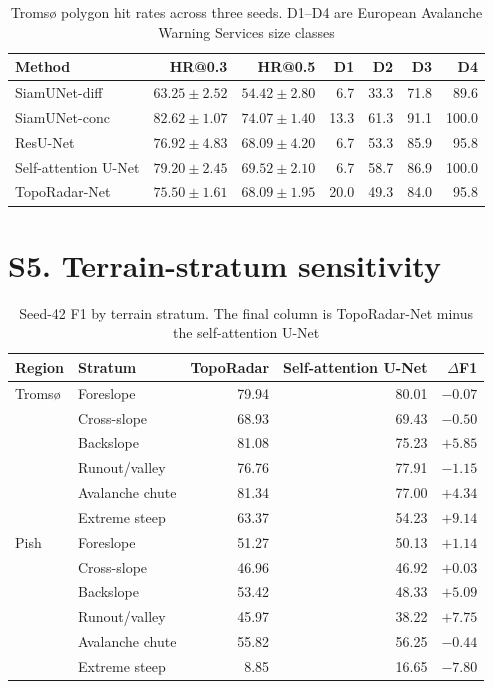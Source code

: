 \documentclass[11pt,a4paper]{article}
\begin{document}
\begin{table}[h]
\caption{Troms{\o} polygon hit rates across three seeds. D1--D4 are European Avalanche Warning Services size classes}
\centering
\small
\begin{tabular}{lrrrrrr}
\toprule
Method & HR@0.3 & HR@0.5 & D1 & D2 & D3 & D4 \\
\midrule
SiamUNet-diff & $63.25\pm2.52$ & $54.42\pm2.80$ & 6.7 & 33.3 & 71.8 & 89.6 \\
SiamUNet-conc & $82.62\pm1.07$ & $74.07\pm1.40$ & 13.3 & 61.3 & 91.1 & 100.0 \\
ResU-Net & $76.92\pm4.83$ & $68.09\pm4.20$ & 6.7 & 53.3 & 85.9 & 95.8 \\
Self-attention U-Net & $79.20\pm2.45$ & $69.52\pm2.10$ & 6.7 & 58.7 & 86.9 & 100.0 \\
TopoRadar-Net & $75.50\pm1.61$ & $68.09\pm1.95$ & 20.0 & 49.3 & 84.0 & 95.8 \\
\bottomrule
\end{tabular}
\end{table}

\section*{S5. Terrain-stratum sensitivity}

\begin{table}[h]
\caption{Seed-42 F1 by terrain stratum. The final column is TopoRadar-Net minus the self-attention U-Net}
\centering
\small
\begin{tabular}{llrrr}
\toprule
Region & Stratum & TopoRadar & Self-attention U-Net & $\Delta$F1 \\
\midrule
Troms{\o} & Foreslope & 79.94 & 80.01 & $-0.07$ \\
 & Cross-slope & 68.93 & 69.43 & $-0.50$ \\
 & Backslope & 81.08 & 75.23 & $+5.85$ \\
 & Runout/valley & 76.76 & 77.91 & $-1.15$ \\
 & Avalanche chute & 81.34 & 77.00 & $+4.34$ \\
 & Extreme steep & 63.37 & 54.23 & $+9.14$ \\
\midrule
Pish & Foreslope & 51.27 & 50.13 & $+1.14$ \\
 & Cross-slope & 46.96 & 46.92 & $+0.03$ \\
 & Backslope & 53.42 & 48.33 & $+5.09$ \\
 & Runout/valley & 45.97 & 38.22 & $+7.75$ \\
 & Avalanche chute & 55.82 & 56.25 & $-0.44$ \\
 & Extreme steep & 8.85 & 16.65 & $-7.80$ \\
\bottomrule
\end{tabular}
\end{table}
\end{document}
